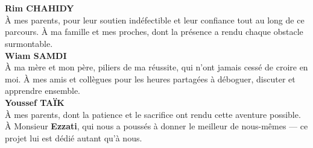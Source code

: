 \chapter*{}
\thispagestyle{empty}
\vspace*{3cm}

\begin{flushright}
\itshape\large

\textcolor{NavyBlue}{\normalsize\bfseries\upshape Rim CHAHIDY}\\[10pt]
À mes parents, pour leur soutien indéfectible et leur confiance tout au long
de ce parcours. À ma famille et mes proches, dont la présence a rendu chaque
obstacle surmontable.\\[2.5cm]

\textcolor{NavyBlue}{\normalsize\bfseries\upshape Wiam SAMDI}\\[10pt]
À ma mère et mon père, piliers de ma réussite, qui n'ont jamais cessé de
croire en moi. À mes amis et collègues pour les heures partagées à déboguer,
discuter et apprendre ensemble.\\[2.5cm]

\textcolor{NavyBlue}{\normalsize\bfseries\upshape Youssef TAÏK}\\[10pt]
À mes parents, dont la patience et le sacrifice ont rendu cette aventure
possible. À Monsieur \textbf{Ezzati}, qui nous a poussés à donner le meilleur
de nous-mêmes — ce projet lui est dédié autant qu'à nous.

\end{flushright}
